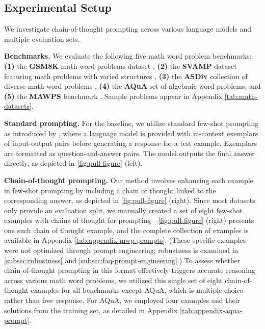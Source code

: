 \subsection{Experimental Setup}

We investigate chain-of-thought prompting across various language models and multiple evaluation sets.

\textbf{Benchmarks.}
We evaluate the following five math word problem benchmarks:
\textbf{(1)} the \textbf{GSM8K} math word problems dataset \citep{cobbe2021training}, 
\textbf{(2)} the \textbf{SVAMP} dataset featuring math problems with varied structures \citep{patel-etal-2021-nlp},
\textbf{(3)} the \textbf{ASDiv} collection of diverse math word problems \citep{miao-etal-2020-diverse},
\textbf{(4)} the \textbf{AQuA} set of algebraic word problems, and
\textbf{(5)} the \textbf{MAWPS} benchmark \citep{koncel-kedziorski-etal-2016-mawps}. Sample problems appear in Appendix \cref{tab:math-datasets}.

\textbf{Standard prompting.} For the baseline, we utilize standard few-shot prompting as introduced by \citet{brown2020language}, where a language model is provided with in-context exemplars of input-output pairs before generating a response for a test example. Exemplars are formatted as question-and-answer pairs. The model outputs the final answer directly, as depicted in \cref{fig:pull-figure} (left).

\textbf{Chain-of-thought prompting.} Our method involves enhancing each example in few-shot prompting by including a chain of thought linked to the corresponding answer, as depicted in \cref{fig:pull-figure} (right). Since most datasets only provide an evaluation split, we manually created a set of eight few-shot examples with chains of thought for prompting—\cref{fig:pull-figure} (right) presents one such chain of thought example, and the complete collection of examples is available in Appendix \cref{tab:appendix-mwp-prompts}. (These specific examples were not optimized through prompt engineering; robustness is examined in \cref{subsec:robustness} and \cref{subsec:faq-prompt-engineering}.) To assess whether chain-of-thought prompting in this format effectively triggers accurate reasoning across various math word problems, we utilized this single set of eight chain-of-thought examples for all benchmarks except AQuA, which is multiple-choice rather than free response. For AQuA, we employed four examples and their solutions from the training set, as detailed in Appendix \cref{tab:appendix-aqua-prompt}.


